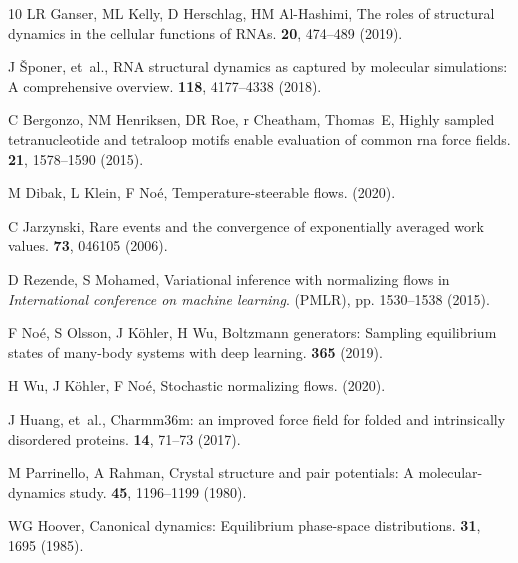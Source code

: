 \documentclass[9pt,twocolumn,twoside]{pnas-new}
\begin{document}
\begin{thebibliography}{10}
LR Ganser, ML Kelly, D Herschlag, HM Al-Hashimi, The roles of structural
  dynamics in the cellular functions of {RNAs}.
  \textbf{20}, 474--489 (2019).

J {\v{S}}poner, et~al., {RNA} structural dynamics as captured by molecular
  simulations: A comprehensive overview.
 \textbf{118}, 4177--4338
  (2018).

C Bergonzo, NM Henriksen, DR Roe, r Cheatham, Thomas~E, Highly sampled
  tetranucleotide and tetraloop motifs enable evaluation of common rna force
  fields.
 \textbf{21},
  1578--1590 (2015).

M Dibak, L Klein, F No{\'e}, Temperature-steerable flows.
 (2020).

C Jarzynski, Rare events and the convergence of exponentially averaged work
  values.
 \textbf{73}, 046105
  (2006).

D Rezende, S Mohamed, Variational inference with normalizing flows in {\em
  International conference on machine learning}.
\newblock (PMLR), pp. 1530--1538 (2015).

F No{\'e}, S Olsson, J K{\"o}hler, H Wu, Boltzmann generators: Sampling
  equilibrium states of many-body systems with deep learning.
 \textbf{365} (2019).

H Wu, J K{\"o}hler, F No{\'e}, Stochastic normalizing flows.
 (2020).

J Huang, et~al., Charmm36m: an improved force field for folded and
  intrinsically disordered proteins.
 \textbf{14}, 71--73
  (2017).

M Parrinello, A Rahman, Crystal structure and pair potentials: A
  molecular-dynamics study.
 \textbf{45}, 1196--1199
  (1980).

WG Hoover, Canonical dynamics: Equilibrium phase-space distributions.
 \textbf{31}, 1695
  (1985).


\end{thebibliography}
\end{document}
